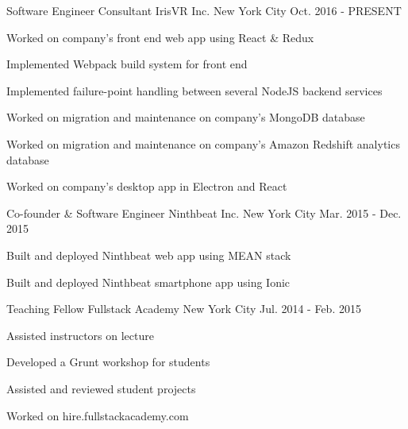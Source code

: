 

\begin{cventries}

  \cventry
    {Software Engineer Consultant} %
    {IrisVR Inc.} %
    {New York City} %
    {Oct. 2016 - PRESENT} %
    {
      \begin{cvitems} %
      \item {Worked on company's front end web app using React \& Redux}
        \item {Implemented Webpack build system for front end}
        \item {Implemented failure-point handling between several NodeJS backend services}
        \item {Worked on migration and maintenance on company's MongoDB database}
        \item {Worked on migration and maintenance on company's Amazon Redshift analytics database}
        \item {Worked on company's desktop app in Electron and React}
      \end{cvitems}
    }

  \cventry
    {Co-founder \& Software Engineer} %
    {Ninthbeat Inc.} %
    {New York City} %
    {Mar. 2015 - Dec. 2015} %
    {
      \begin{cvitems} %
        \item {Built and deployed Ninthbeat web app using MEAN stack}
        \item {Built and deployed Ninthbeat smartphone app using Ionic}
      \end{cvitems}
    }

  \cventry
    {Teaching Fellow} %
    {Fullstack Academy} %
    {New York City} %
    {Jul. 2014 - Feb. 2015} %
    {
      \begin{cvitems} %
        \item {Assisted instructors on lecture}
        \item {Developed a Grunt workshop for students}
        \item {Assisted and reviewed student projects}
        \item {Worked on hire.fullstackacademy.com}
      \end{cvitems}
    }

\end{cventries}
